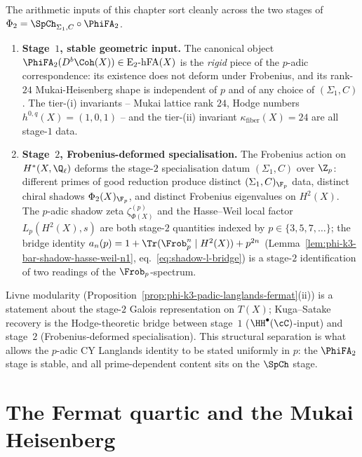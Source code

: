 \begin{remark}
\label{rem:padic-stage-discipline}
The arithmetic inputs of this chapter sort cleanly across the two stages
of $\Phi_2 = \SpCh_{\Sigma_1, C} \circ \PhiFA_2$.
\begin{enumerate}[label=\textup{(\roman*)}]
\item \textbf{Stage~$1$, stable geometric input.} The canonical object
$\PhiFA_2(D^b\Coh(X)) \in \mathrm{E}_2\text{-}\mathrm{hFA}(X)$ is the
\emph{rigid} piece of the $p$-adic correspondence: its existence does not
deform under Frobenius, and its rank-$24$ Mukai-Heisenberg shape is
independent of $p$ and of any choice of $(\Sigma_1, C)$. The
tier-(i) invariants -- Mukai lattice rank $24$, Hodge numbers
$h^{0,q}(X) = (1, 0, 1)$ -- and the tier-(ii) invariant
$\kappa_{\mathrm{fiber}}(X) = 24$ are all stage-$1$ data.
\item \textbf{Stage~$2$, Frobenius-deformed specialisation.} The Frobenius
action on $H^\ast(X, \Q_\ell)$ deforms the stage-$2$ specialisation
datum $(\Sigma_1, C)$ over $\Z_p$: different primes of good reduction
produce distinct $(\Sigma_1, C)_{\F_p}$ data, distinct chiral shadows
$\Phi_2(X)_{\F_p}$, and distinct Frobenius eigenvalues on $H^2(X)$. The
$p$-adic shadow zeta $\zeta^{(p)}_{\Phi(X)}$ and the Hasse--Weil local
factor $L_p(H^2(X), s)$ are both stage-$2$ quantities indexed by
$p \in \{3, 5, 7, \ldots\}$; the bridge identity $a_n(p) =
1 + \Tr(\Frob_p^n \mid H^2(X)) + p^{2n}$
(Lemma~\ref{lem:phi-k3-bar-shadow-hasse-weil-n1},
eq.~\eqref{eq:shadow-l-bridge}) is a stage-$2$ identification of two
readings of the $\Frob_p$-spectrum.
\end{enumerate}
Livne modularity
(Proposition~\ref{prop:phi-k3-padic-langlands-fermat}(ii)) is a statement
about the stage-$2$ Galois representation on $T(X)$; Kuga--Satake
recovery is the Hodge-theoretic bridge between stage~$1$
($\HH^\bullet(\cC)$-input) and stage~$2$ (Frobenius-deformed
specialisation). This structural separation is what allows the
$p$-adic CY Langlands identity to be stated uniformly in $p$: the
$\PhiFA_2$ stage is stable, and all prime-dependent content sits on the
$\SpCh$ stage.
\end{remark}


\section{The Fermat quartic and the Mukai Heisenberg}
\label{sec:padic-fermat-phi}

